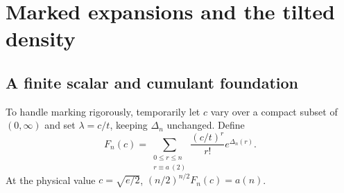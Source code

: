 \section{Marked expansions and the tilted density}\label{spb:ml:sec:marked}
\subsection{A finite scalar and cumulant foundation}
To handle marking rigorously, temporarily let $c$ vary over a compact subset of $(0,\infty)$ and set $\lambda=c/t$, keeping $\Delta_n$ unchanged. Define
\begin{equation}\label{spb:ml:eq:Fn}
 F_n(c)=\sum_{\substack{0\le r\le n\\r\equiv a\ (2)}}
 \frac{(c/t)^r}{r!}e^{\Delta_n(r)}.
\end{equation}
At the physical value $c=\sqrt{e/2}$, $(n/2)^{n/2}F_n(c)=a(n)$.

